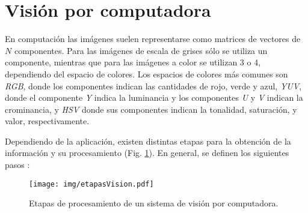 
\section{Visión por computadora}

\label{mt_visionComputadora}

En computación las imágenes suelen representarse como matrices de vectores de
$N$ componentes. Para las imágenes de escala de grises sólo se utiliza un
componente, mientras que para las imágenes a color se utilizan 3 o 4,
dependiendo del espacio de colores. Los espacios de colores más comunes son
\emph{RGB}, donde los componentes indican las cantidades de rojo, verde y
azul, \emph{YUV}, donde el componente \emph{Y} indica la luminancia y los
componentes \emph{U} y \emph{V} indican la crominancia, y \emph{HSV} donde sus
componentes indican la tonalidad, saturación, y valor, respectivamente.

Dependiendo de la aplicación, existen distintas etapas para la obtención de la
información y su procesamiento (Fig. \ref{etapasVision}). En general, se definen los
siguientes pasos \cite{digitalImageProcessing2ed,wikiCV}:

\begin{figure}[!htb]

	\centering
	\texttt{[image: img/etapasVision.pdf]}
	\caption{Etapas de procesamiento de un sistema de visión por
	computadora.}

	\label{etapasVision}

\end{figure}

